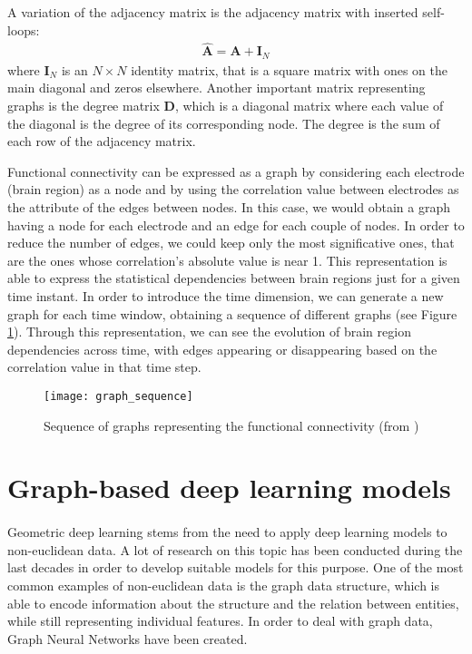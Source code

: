 A variation of the adjacency matrix is the adjacency matrix with inserted self-loops:
\begin{align*}
    \hat{\mathbf{A}} = \mathbf{A} + \mathbf{I}_N
\end{align*}
where $\mathbf{I}_N$ is an $N \times N$ identity matrix, that is a square matrix with ones on the main diagonal and zeros elsewhere. Another important matrix representing graphs is the degree matrix $\mathbf{D}$, which is a diagonal matrix where each value of the diagonal is the degree of its corresponding node. The degree is the sum of each row of the adjacency matrix.

Functional connectivity can be expressed as a graph by considering each electrode (brain region) as a node and by using the correlation value between electrodes as the attribute of the edges between nodes. In this case, we would obtain a graph having a node for each electrode and an edge for each couple of nodes. In order to reduce the number of edges, we could keep only the most significative ones, that are the ones whose correlation's absolute value is near 1. This representation is able to express the statistical dependencies between brain regions just for a given time instant. In order to introduce the time dimension, we can generate a new graph for each time window, obtaining a sequence of different graphs (see Figure \ref{fig:graph_sequence}). Through this representation, we can see the evolution of brain region dependencies across time, with edges appearing or disappearing based on the correlation value in that time step.
\begin{figure}[htbp]
    \centering
    \texttt{[image: graph\_sequence]}
    \caption{Sequence of graphs representing the functional connectivity (from \cite{arXiv:graphstream})}
    \label{fig:graph_sequence}
\end{figure}


\section{Graph-based deep learning models} \label{sec: graph_dl}
\paragraph{} Geometric deep learning stems from the need to apply deep learning models to non-euclidean data. A lot of research on this topic has been conducted during the last decades in order to develop suitable models for this purpose. One of the most common examples of non-euclidean data is the graph data structure, which is able to encode information about the structure and the relation between entities, while still representing individual features. In order to deal with graph data, Graph Neural Networks have been created.

